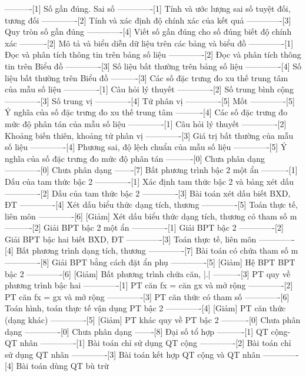 ----------[1] Số gần đúng. Sai số
-------------[1] Tính và ước lượng sai số tuyệt đối, tương đối
-------------[2] Tính và xác định độ chính xác của kết quả
-------------[3] Quy tròn số gần đúng
-------------[4] Viết số gần đúng cho số đúng biết độ chính xác
----------[2] Mô tả và biểu diễn dữ liệu trên các bảng và biểu đồ
-------------[1] Đọc và phân tích thông tin trên bảng số liệu
-------------[2] Đọc và phân tích thông tin trên Biểu đồ
-------------[3] Số liệu bất thường trên bảng số liệu
-------------[4] Số liệu bất thường trên Biểu đồ
----------[3] Các số đặc trưng đo xu thế trung tâm của mẫu số liệu
-------------[1] Câu hỏi lý thuyết
-------------[2] Số trung bình cộng
-------------[3] Số trung vị
-------------[4] Tứ phân vị
-------------[5] Mốt
-------------[5] Ý nghĩa của số đặc trưng đo xu thế trung tâm
----------[4] Các số đặc trưng đo mức độ phân tán của mẫu số liệu
-------------[1] Câu hỏi lý thuyết
-------------[2] Khoảng biến thiên, khoảng tứ phân vị
-------------[3] Giá trị bất thường của mẫu số liệu
-------------[4] Phương sai, độ lệch chuẩn của mẫu số liệu
-------------[5] Ý nghĩa của số đặc trưng đo mức độ phân tán
----------[0] Chưa phân dạng
-------------[0] Chưa phân dạng
-------[7] Bất phương trình bậc 2 một ẩn
----------[1] Dấu của tam thức bậc 2
-------------[1] Xác định tam thức bậc 2 và bảng xét dấu
-------------[2] Dấu của tam thức bậc 2
-------------[3] Bài toán xét dấu biết BXD, ĐT
-------------[4] Xét dấu biểu thức dạng tích, thương
-------------[5] Toán thực tế, liên môn
-------------[6] [Giảm] Xét dấu biểu thức dạng tích, thương có tham số m
----------[2] Giải BPT bậc 2 một ẩn
-------------[1] Giải BPT bậc 2
-------------[2] Giải BPT bậc hai biết BXD, ĐT
-------------[3] Toán thực tế, liên môn
-------------[4] Bất phương trình dạng tích, thương
-------------[7] Bài toán có chứa tham số m
-------------[8] Giải BPT bằng cách đặt ẩn phụ
-------------[5] [Giảm] Hệ BPT BPT bậc 2
-------------[6] [Giảm] Bất phương trình chứa căn, |.|
----------[3] PT quy về phương trình bậc hai
-------------[1] PT căn fx = căn gx và mở rộng
-------------[2] PT căn fx = gx và mở rộng
-------------[3] PT căn thức có tham số
-------------[6] Toán hình, toán thực tế vận dụng PT bậc 2
-------------[4] [Giảm] PT căn thức (dạng khác)
-------------[5] [Giảm] PT khác quy về PT bậc 2
----------[0] Chưa phân dạng
-------------[0] Chưa phân dạng
-------[8] Đại số tổ hợp
----------[1] QT cộng-QT nhân
-------------[1] Bài toán chỉ sử dụng QT cộng
-------------[2] Bài toán chỉ sử dụng QT nhân
-------------[3] Bài toán kết hợp QT cộng và QT nhân
-------------[4] Bài toán dùng QT bù trừ
